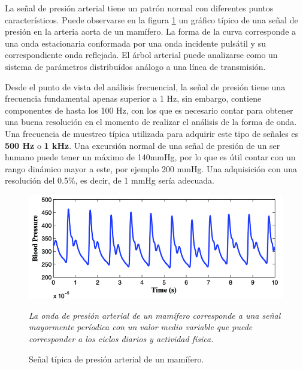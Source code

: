 La señal de presión arterial tiene un patrón normal con diferentes puntos característicos. Puede observarse en la figura \ref{fig:senpresion} un gráfico típico de una señal de presión en la arteria aorta de un mamífero. La forma de la curva corresponde a una onda estacionaria conformada por una onda incidente pulsátil y su correspondiente onda reflejada. El árbol arterial puede analizarse como un sistema de parámetros distribuídos análogo a una línea de transmisión. 

Desde el punto de vista del análisis frecuencial, la señal de presión tiene una frecuencia fundamental apenas superior a 1 Hz, sin embargo, contiene componentes de hasta los 100 Hz, con los que es necesario contar para obtener una buena resolución en el momento de realizar el análisis de la forma de onda. Una frecuencia de muestreo típica utilizada para adquirir este tipo de señales es \textbf{500 Hz} o \textbf{1 kHz}. Una excursión normal de una señal de presión de un ser humano puede tener un máximo de 140mmHg, por lo que es útil contar con un rango dinámico mayor a este, por ejemplo 200 mmHg. Una adquisición con una resolución del 0.5\%, es decir, de 1 mmHg sería adecuada.

\begin{figure}[!htbp]
	\centering
	
	\begin{minipage}{0.65\textwidth}
		\includegraphics[width=\textwidth]{./Figures/senpresion.png}
		{\footnotesize \textit{La onda de presión arterial de un mamífero corresponde a una señal mayormente períodica con un valor medio variable que puede corresponder a los ciclos diarios y actividad física.}\par}		
	\end{minipage}		
	
	\caption{Señal típica de presión arterial de un mamífero.}
	\label{fig:senpresion}
\end{figure}

